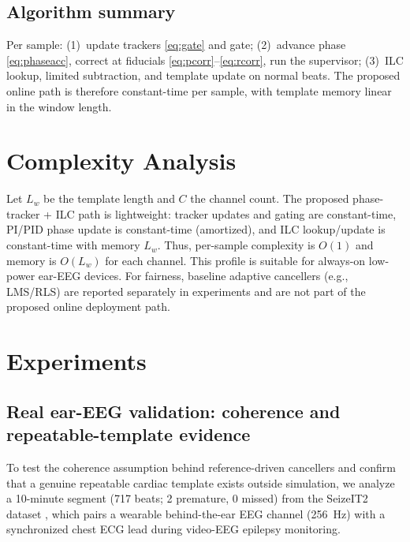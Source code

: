 \documentclass[11pt]{article}
\begin{document}
\subsection{Algorithm summary}

Per sample: (1)~update trackers \eqref{eq:gate} and gate; (2)~advance phase \eqref{eq:phaseacc}, 
correct at fiducials \eqref{eq:pcorr}--\eqref{eq:rcorr}, run the supervisor; (3)~ILC
lookup, limited subtraction, and template update on normal beats. The proposed online path is
therefore constant-time per sample, with template memory 
linear in the window length.


\section{Complexity Analysis}
\label{sec:complexity_analysis}

Let $L_w$ be the template length and $C$ the channel count. The proposed phase-tracker + ILC path 
is lightweight: tracker updates and gating are constant-time, PI/PID phase update is constant-time 
(amortized), and ILC lookup/update is constant-time with memory $L_w$. Thus, per-sample complexity 
is $O(1)$ and memory is $O(L_w)$ for each channel. This profile is suitable for always-on 
low-power ear-EEG devices. For fairness, baseline adaptive cancellers (e.g., LMS/RLS) are reported 
separately in experiments and are not part of the proposed online deployment path.


\section{Experiments}
\label{sec:experiments}



\subsection{Real ear-EEG validation: coherence and repeatable-template evidence}
\label{sec:realdata}
To test the coherence assumption behind reference-driven cancellers and confirm that a genuine
repeatable cardiac template exists outside simulation, we analyze a 10-minute segment (717 beats;
2 premature, 0 missed) from the SeizeIT2 dataset \cite{seizeit2}, which pairs a wearable
behind-the-ear EEG channel (256~Hz) with a synchronized chest ECG lead during video-EEG epilepsy
monitoring.
\end{document}
